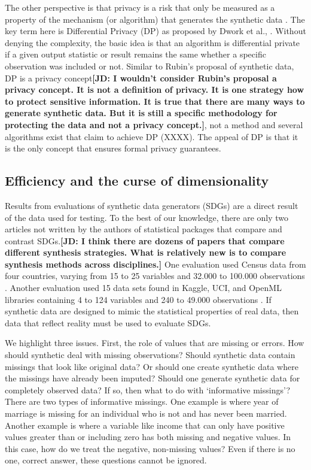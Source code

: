 \documentclass[runningheads]{llncs}
\newcommand{\jd}[1]{\scriptsize {\bf \color{red}[JD: #1]}\normalsize}
\begin{document}
The other perspective is that privacy is a risk that only be measured as a property of the mechanism (or algorithm) that generates the synthetic data \cite{jordon2022synthetic}.  The key term here is Differential Privacy (DP) as proposed by Dwork et al., \cite{dwork2006calibrating}.  Without denying the complexity, the basic idea is that an algorithm is differential private if a given output statistic or result remains the same whether a specific observation was included or not.  Similar to Rubin's proposal of synthetic data, DP is a privacy concept\jd{I wouldn't consider Rubin's proposal a privacy concept. It is not a definition of privacy. It is one strategy how to protect sensitive information. It is true that there are many ways to generate synthetic data. But it is still a specific methodology for protecting the data and not a privacy concept.}, not a method and several algorithms exist that claim to achieve DP (XXXX).  The appeal of DP is that it is the only concept that ensures formal privacy guarantees.

\subsection{Efficiency and the curse of dimensionality}

Results from evaluations of synthetic data generators (SDGs) are a direct result of the data used for testing.  To the best of our knowledge, there are only two articles not written by the authors of statistical packages that compare and contrast SDGs.\jd{I think there are dozens of papers that compare different synthesis strategies. What is relatively new is to compare synthesis methods across disciplines.}  One evaluation used Census data from four countries, varying from 15 to 25 variables and 32.000 to 100.000 observations \cite{little2022comparing}.  Another evaluation used 15 data sets found in Kaggle, UCI, and OpenML libraries containing 4 to 124 variables and 240 to 49.000 observations \cite{dankar2021fake}.  If synthetic data are designed to mimic the statistical properties of real data, then data that reflect reality must be used to evaluate SDGs.  

We highlight three issues.  First, the role of values that are missing or errors.  How should synthetic deal with missing observations?  Should synthetic data contain missings that look like original data?  Or should one create synthetic data where the missings have already been imputed?  Should one generate synthetic data for completely observed data?  If so, then what to do with `informative missings'?  There are two types of informative missings.  One example is where year of marriage is missing for an individual who is not and has never been married.  Another example is where a variable like income that can only have positive values greater than or including zero has both missing and negative values.  In this case, how do we treat the negative, non-missing values?  Even if there is no one, correct answer, these questions cannot be ignored.
\end{document}
